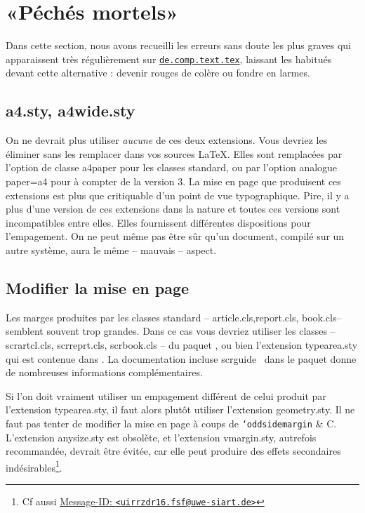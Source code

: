\documentclass[fontsize=11pt, paper=a4, pagesize, captions=tableheading, numbers=enddot, toc=graduated, footnotes=multiple]{scrartcl}%
\newcommand{\News}[1]{\href{news:#1}{\texttt{#1}}}
\newcommand{\MID}[2]{\href{http://groups.google.com/groups?as_umsgid=#1}%
    {Message-ID: \texttt{<#2>}}}
\newcommand{\News}[1]{\href{news:#1}{\texttt{#1}}}
\newcommand{\MID}[2]{\href{M-ID: <#1>}{Message-ID: \texttt{<#2>}}}
\DeclareRobustCommand*{\Macro}[1]{\mbox{\texttt{\char`\\#1}}}
\newcommand{\Doku}[1]{\textsf{#1}\xspace}
\newcommand{\Paket}[1]{\textsf{#1.sty}\xspace}
\newcommand{\Klasse}[1]{\textsf{#1.cls}\xspace}
\newcommand{\Option}[1]{\textsf{#1}\xspace}
\begin{document}
\clearpage
\tableofcontents
\clearpage
{}

\section{«Péchés mortels»}
\label{sec:todsunden}

Dans cette section, nous avons recueilli les erreurs sans doute les plus graves qui apparaissent très régulièrement sur \News{de.comp.text.tex}, laissant les habitués devant cette alternative : devenir rouges de colère ou fondre en larmes.

\subsection{\Paket{a4}, \Paket{a4wide}}
\label{sec:paketa4-paketa4wide}

On ne devrait plus utiliser \emph{aucune} de ces deux extensions. Vous devriez les éliminer sans les remplacer dans vos sources \LaTeX. Elles sont remplacées par l'option de classe \Option{a4paper} pour les classes standard, ou par l’option analogue \Option{paper=a4} pour \KOMAScript{} à compter de la version 3. La mise en page que produisent ces extensions est plus que critiquable d'un point de vue typographique. Pire, il y a plus d'une version de ces extensions dans la nature et toutes ces versions sont incompatibles entre elles. Elles fournissent différentes dispositions pour l’empagement. On ne peut même pas être sûr qu’un document, compilé sur un autre système, aura le même – mauvais – aspect.

\subsection{Modifier la mise en page}
\label{sec:layoutanderungen}

Les marges produites par les classes standard – \Klasse{article},\Klasse{report}, \Klasse{book}– semblent souvent trop grandes. Dans ce cas vous devriez utiliser les classes – \Klasse{scrartcl}, \Klasse{scrreprt}, \Klasse{scrbook} – du paquet \KOMAScript, ou bien l'extension \Paket{typearea} qui est contenue dans \KOMAScript. La documentation incluse \Doku{scrguide}~\cite{kohm-12} dans le paquet donne de nombreuses informations complémentaires.

Si l’on doit vraiment utiliser un empagement différent de celui produit par l'extension \Paket{typearea}, il faut alors plutôt utiliser l’extension \Paket{geometry}. Il ne faut pas tenter de modifier la mise en page à coups de \Macro{oddsidemargin} \& C. L’extension \Paket{anysize} est obsolète, et l’extension \Paket{vmargin}, autrefois recommandée, devrait être évitée, car elle peut produire des effets secondaires indésirables\footnote{Cf aussi \MID{uirrzdr16.fsf@uwe-siart.de}{uirrzdr16.fsf@uwe-siart.de}}.
\end{document}
